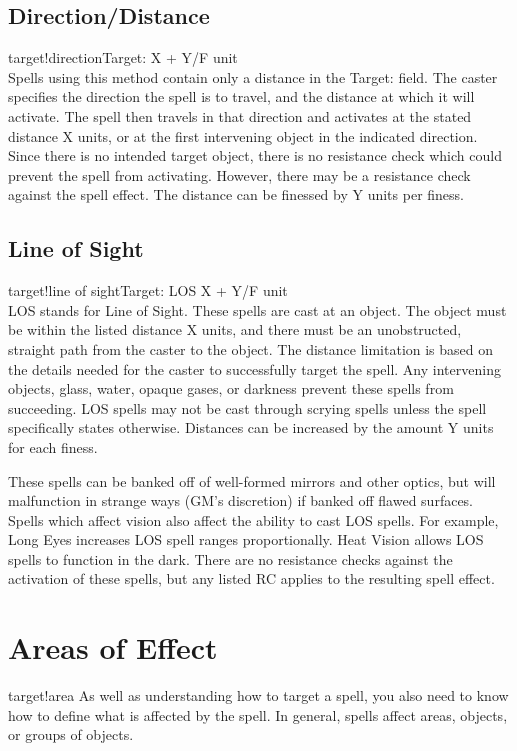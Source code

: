 \subsection{Direction/Distance}
target!directionTarget: X + Y/F unit\\
Spells using this method contain only a distance in the Target: field. The caster specifies the direction the spell is to travel, and the distance at which it will activate. The spell then travels in that direction and activates at the stated distance X units, or at the first intervening object in the indicated direction. Since there is no intended target object, there is no resistance check which could prevent the spell from activating. However, there may be a resistance check against the spell effect. The distance can be finessed by Y units per finess.
\subsection{Line of Sight}
target!line of sightTarget: LOS X + Y/F unit\\
LOS stands for Line of Sight. These spells are cast at an object. The object must be within the listed distance X units, and there must be an unobstructed, straight path from the caster to the object. The distance limitation is based on the details needed for the caster to successfully target the spell. Any intervening objects, glass, water, opaque gases, or darkness prevent these spells from succeeding. LOS spells may not be cast through scrying spells unless the spell specifically states otherwise. Distances can be increased by the amount Y units for each finess.

These spells can be banked off of well-formed mirrors and other optics, but will malfunction in strange ways (GM's discretion) if banked off flawed surfaces. Spells which affect vision also affect the ability to cast LOS spells. For example, Long Eyes increases LOS spell ranges proportionally. Heat Vision allows LOS spells to function in the dark. There are no resistance checks against the activation of these spells, but any listed RC applies to the resulting spell effect.
\section{Areas of Effect}
target!area
As well as understanding how to target a spell, you also need to know how to define what is affected by the spell. In general, spells affect areas, objects, or groups of objects.


